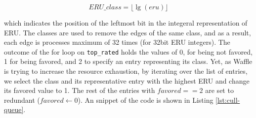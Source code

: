 \begin{equation}
  \label{eq:eru-class}
  ERU\_class = \lfloor \lg(eru) \rfloor  
\end{equation}

which indicates the position of the leftmost bit in the integeral representation of ERU. The classes are used to remove the edges of the same class, and as a result, each edge is processes maximum of 32 times (for 32bit ERU integers). The outcome of the for loop on \texttt{top\_rated} holds the values of 0, for being not favored, 1 for being favored, and 2 to specify an entry representing its class. Yet, as Waffle is trying to increase the resource exhaustion, by iterating over the list of entries, we select the class and its representative entry with the highest ERU and change its favored value to 1. The rest of the entries with $favored == 2$ are set to redundant ($ favored \leftarrow 0 $). An snippet of the code is shown in Listing \ref{lst:cull-queue}.




